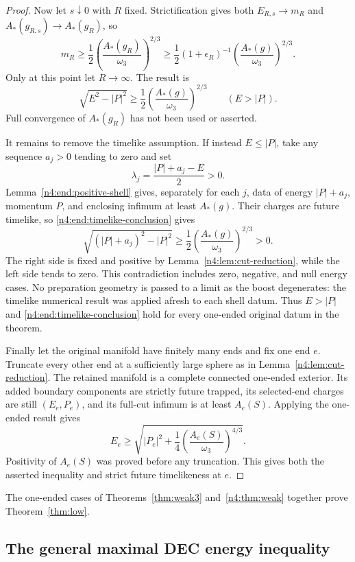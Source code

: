 \begin{proof}
Now let $s\downarrow0$ with $R$ fixed. Strictification gives both
$E_{R,s}\to m_R$ and $A_*(g_{R,s})\to A_*(g_R)$, so
\[
 m_R\ge\frac12
       \left(\frac{A_*(g_R)}{\omega_3}\right)^{2/3}
 \ge\frac12(1+\epsilon_R)^{-1}
       \left(\frac{A_*(g)}{\omega_3}\right)^{2/3}.
\]
Only at this point let $R\to\infty$. The result is
\begin{equation}\label{n4:end:timelike-conclusion}
 \sqrt{E^2-|P|^2}\ge\frac12
       \left(\frac{A_*(g)}{\omega_3}\right)^{2/3}
       \qquad (E>|P|).
\end{equation}
Full convergence of $A_*(g_R)$ has not been used or asserted.

It remains to remove the timelike assumption. If instead $E\le|P|$,
take any sequence $a_j>0$ tending to zero and set
\[
 \lambda_j=\frac{|P|+a_j-E}{2}>0.
\]
Lemma~\ref{n4:end:positive-shell} gives, separately for each $j$,
data of energy $|P|+a_j$, momentum $P$, and enclosing infimum at
least $A_*(g)$. Their charges are future timelike, so
\eqref{n4:end:timelike-conclusion} gives
\[
 \sqrt{(|P|+a_j)^2-|P|^2}
 \ge\frac12\left(\frac{A_*(g)}{\omega_3}\right)^{2/3}>0.
\]
The right side is fixed and positive by
Lemma~\ref{n4:lem:cut-reduction}, while the left side tends to zero.
This contradiction includes zero, negative, and null energy cases.
No preparation geometry is passed to a limit as the boost degenerates:
the timelike numerical result was applied afresh to each shell datum.
Thus $E>|P|$ and \eqref{n4:end:timelike-conclusion} hold for every
one-ended original datum in the theorem.

Finally let the original manifold have finitely many ends and fix
one end $e$. Truncate every other end at a sufficiently large sphere
as in Lemma~\ref{n4:lem:cut-reduction}. The retained manifold is a
complete connected one-ended exterior. Its added boundary components
are strictly future trapped, its selected-end charges are still
$(E_e,P_e)$, and its full-cut infimum is at least $A_e(S)$. Applying
the one-ended result gives
\[
 E_e\ge\sqrt{|P_e|^2+
              \frac14\left(\frac{A_e(S)}{\omega_3}\right)^{4/3}}.
\]
Positivity of $A_e(S)$ was proved before any truncation. This gives
both the asserted inequality and strict future timelikeness at $e$.
\end{proof}

The one-ended cases of Theorems~\ref{thm:weak3} and~\ref{n4:thm:weak}
together prove Theorem~\ref{thm:low}.

\subsection{The general maximal DEC energy inequality}


